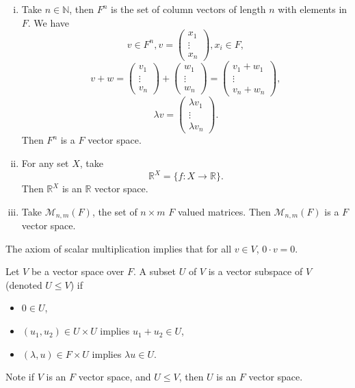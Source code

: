 \documentclass[12pt]{article}
\begin{document}
\begin{exbox}
	\begin{enumerate}[(i)]
		\item Take $n \in \mathbb{N}$, then $F^{n}$ is the set of column vectors of length $n$ with elements in $F$. We have
			\[
			v \in F^{n}, v =
			\begin{pmatrix}
				x_1 \\
				\vdots \\
				x_n
			\end{pmatrix}
			, x_i \in F
			,\]
			\[
			v + w =
			\begin{pmatrix}
				v_1 \\
				\vdots \\
				v_n
			\end{pmatrix}
			+
			\begin{pmatrix}
				w_1 \\
				\vdots \\
				w_n
			\end{pmatrix}
			=
			\begin{pmatrix}
				v_1 + w_1 \\
				\vdots \\
				v_n + w_n
			\end{pmatrix}
			,\]
			\[
			\lambda v =
			\begin{pmatrix}
				\lambda v_1 \\
				\vdots \\
				\lambda v_n
			\end{pmatrix}
			.\]
			Then $F^{n}$ is a $F$ vector space.
		\item For any set $X$, take
			\[
				\mathbb{R}^{X} = \{f : X \to \mathbb{R}\}
			.\]
			Then $\mathbb{R}^{X}$ is an $\mathbb{R}$ vector space.
		\item Take $\mathcal{M}_{n, m}(F)$, the set of $n \times m$ $F$ valued matrices. Then $\mathcal{M}_{n, m}(F)$ is a $F$ vector space.
\end{enumerate}
\end{exbox}

\begin{remark}
	The axiom of scalar multiplication implies that for all $v \in V$, $0 \cdot v = 0$.
\end{remark}

\begin{definition}[Subspace]
	Let $V$ be a vector space over $F$. A subset $U$ of $V$ is a vector subspace of $V$ (denoted $U \leq V$) if
	\begin{itemize}
		\item $0 \in U$,
		\item $(u_1, u_2) \in U \times U$ implies $u_1 + u_2 \in U$,
		\item $(\lambda, u) \in F \times U$ implies $\lambda u \in U$.
	\end{itemize}
\end{definition}
Note if $V$ is an $F$ vector space, and $U \leq V$, then $U$ is an $F$ vector space.
\end{document}
